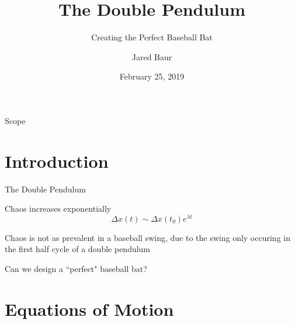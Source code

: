 \documentclass[tikz]{beamer}
\title{The Double Pendulum}
\subtitle{Creating the Perfect Baseball Bat}
\author{Jared Baur}
\institute[Occidental College] %
{
  Physics Department\\
  Occidental College
}
\date{February 25, 2019}
\begin{document}
\begin{frame}
  \titlepage
\end{frame}

\begin{frame}{Scope}
  \tableofcontents
\end{frame}


\section{Introduction}

\begin{frame}{The Double Pendulum}
	\only<1> {	
    		\begin{figure}
		    \centering
		\end{figure}
	}
	 {
    		\begin{figure}
		    \centering
		\end{figure}

		Chaos increases exponentially
		\begin{equation}
			\Delta x(t) \sim \Delta x(t_0) e^{\lambda t}
		\end{equation}
	}
	 {
		Chaos is not as prevalent in a baseball swing, due to the swing only occuring in the first half cycle of a double pendulum
    		\begin{figure}
		    \centering
		\end{figure}
		Can we design a ``perfect" baseball bat?
	}
\end{frame}

\section{Equations of Motion}
\end{document}
